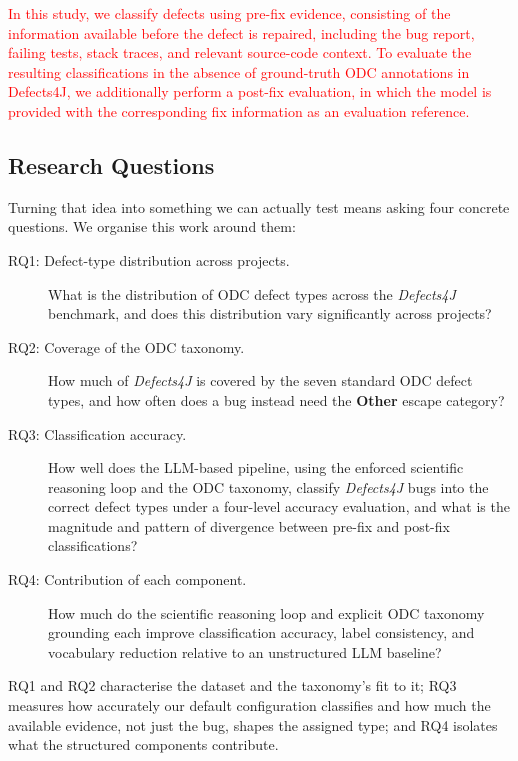 \textcolor{red}{In this study, we classify defects using pre-fix evidence, consisting of the information available before the defect is repaired, including the bug report, failing tests, stack traces, and relevant source-code context. To evaluate the resulting classifications in the absence of ground-truth ODC annotations in Defects4J, we additionally perform a post-fix evaluation, in which the model is provided with the corresponding fix information as an evaluation reference.}
\subsection{Research Questions}
\label{sec:rqs}

Turning that idea into something we can actually test means asking four
concrete questions. We organise this work around them:

\begin{description}
  \item[RQ1: Defect-type distribution across projects.] What is the
        distribution of ODC defect types across the \textit{Defects4J} benchmark,
        and does this distribution vary significantly across projects?
  \item[RQ2: Coverage of the ODC taxonomy.] How much of \textit{Defects4J} is
        covered by the seven standard ODC defect types, and how often does a
        bug instead need the \textbf{Other} escape category?
  \item[RQ3: Classification accuracy.] How well does the LLM-based pipeline,
        using the enforced scientific reasoning loop and the ODC taxonomy,
        classify \textit{Defects4J} bugs into the correct defect types under a
        four-level accuracy evaluation, and what is the magnitude and pattern of
        divergence between pre-fix and post-fix classifications?
  \item[RQ4: Contribution of each component.] How much do the scientific
        reasoning loop and explicit ODC taxonomy grounding each improve
        classification accuracy, label consistency, and vocabulary reduction
        relative to an unstructured LLM baseline?
\end{description}

RQ1 and RQ2 characterise the dataset and the taxonomy's fit to it; RQ3 measures
how accurately our default configuration classifies and how much the available
evidence, not just the bug, shapes the assigned type; and RQ4 isolates what the
structured components contribute.

